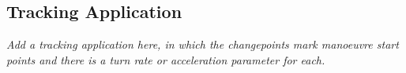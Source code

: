 \documentclass[journal]{IEEEtran}
\newenvironment{meta}[0]{\color{red} \em}{}
\begin{document}
\subsection{Tracking Application}

\begin{meta}
Add a tracking application here, in which the changepoints mark manoeuvre start points and there is a turn rate or acceleration parameter for each.
\end{meta}


%
%



%
%
\end{document}
